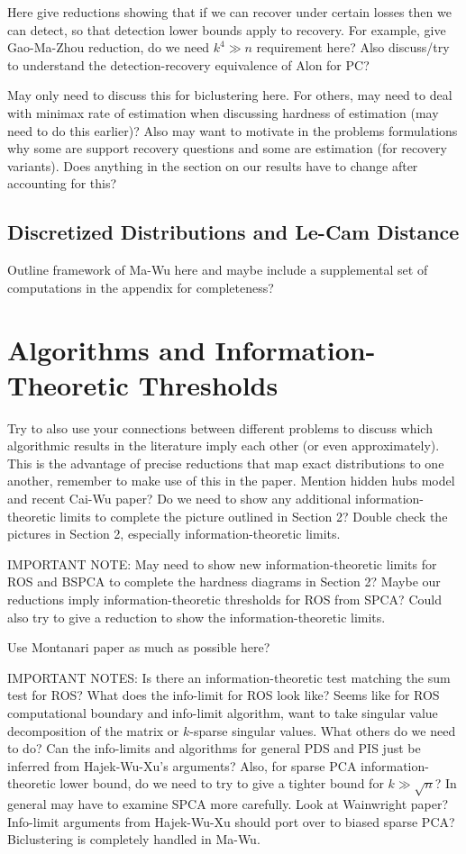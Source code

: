 \documentclass[11pt]{article}
\begin{document}
Here give reductions showing that if we can recover under certain losses then we can detect, so that detection lower bounds apply to recovery. For example, give Gao-Ma-Zhou reduction, do we need $k^4 \gg n$ requirement here? Also discuss/try to understand the detection-recovery equivalence of Alon for PC?

May only need to discuss this for biclustering here. For others, may need to deal with minimax rate of estimation when discussing hardness of estimation (may need to do this earlier)? Also may want to motivate in the problems formulations why some are support recovery questions and some are estimation (for recovery variants). Does anything in the section on our results have to change after accounting for this?

\subsection{Discretized Distributions and Le-Cam Distance}

Outline framework of Ma-Wu here and maybe include a supplemental set of computations in the appendix for completeness?

\section{Algorithms and Information-Theoretic Thresholds}

Try to also use your connections between different problems to discuss which algorithmic results in the literature imply each other (or even approximately). This is the advantage of precise reductions that map exact distributions to one another, remember to make use of this in the paper. Mention hidden hubs model and recent Cai-Wu paper? Do we need to show any additional information-theoretic limits to complete the picture outlined in Section 2? Double check the pictures in Section 2, especially information-theoretic limits.

IMPORTANT NOTE: May need to show new information-theoretic limits for ROS and BSPCA to complete the hardness diagrams in Section 2? Maybe our reductions imply information-theoretic thresholds for ROS from SPCA? Could also try to give a reduction to show the information-theoretic limits.

Use Montanari paper as much as possible here?

IMPORTANT NOTES: Is there an information-theoretic test matching the sum test for ROS? What does the info-limit for ROS look like? Seems like for ROS computational boundary and info-limit algorithm, want to take singular value decomposition of the matrix or $k$-sparse singular values. What others do we need to do? Can the info-limits and algorithms for general PDS and PIS just be inferred from Hajek-Wu-Xu's arguments? Also, for sparse PCA information-theoretic lower bound, do we need to try to give a tighter bound for $k \gg \sqrt{n}$? In general may have to examine SPCA more carefully. Look at Wainwright paper? Info-limit arguments from Hajek-Wu-Xu should port over to biased sparse PCA? Biclustering is completely handled in Ma-Wu.
\end{document}
